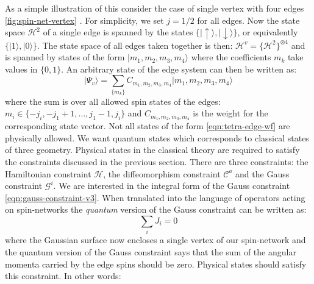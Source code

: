 \documentclass[preprint]{SciPost}
\newcommand{\mc}[1]{\mathcal{#1}}
\newcommand{\ket}[1]{\vert #1 \rangle}
\theoremstyle{plain} %
\begin{document}

As a simple illustration of this consider the case of single vertex with four edges \autoref{fig:spin-net-vertex} . For simplicity, we set $ j = 1/2 $ for all edges. Now the state space $ \mc{H}^2 $ of a single edge is spanned by the states $ \{\ket{\uparrow}, \ket{\downarrow} \} $, or equivalently $ \{ \ket{1}, \ket{0} \} $. The state space of all edges taken together is then: $ \mc{H}^v = \{\mc{H}^2\}^{\otimes 4} $ and is spanned by states of the form $ \ket{m_1, m_2, m_3, m_4} $ where the coefficients $ m_k $ take values in $\{0,1 \}$. An arbitrary state of the edge system can then be written as:
\begin{equation}\label{eqn:tetra-edge-wf}
\ket{\Psi_v} = \sum_{\{m_k\}} C_{m_1, m_2, m_3, m_4} \ket{m_1, m_2, m_3, m_4}
\end{equation}
where the sum is over all allowed spin states of the edges: $ m_i \in \{-j_i, -j_1 + 1, \ldots, j_1 - 1, j_i \} $ and $ C_{m_1, m_2, m_3, m_4} $ is the weight for the corresponding state vector. Not all states of the form \eqref{eqn:tetra-edge-wf} are physically allowed. We want quantum states which corresponds to classical states of three geometry. Physical states in the classical theory are required to satisfy the constraints discussed in the previous section. There are three constraints: the Hamiltonian constraint $ \mc{H} $, the diffeomorphism constraint $ \mc{C}^a $ and the Gauss constraint $ \mc{G}^i $. We are interested in the integral form of the Gauss constraint \eqref{eqn:gauss-constraint-v3}. When translated into the language of operators acting on spin-networks the \emph{quantum} version of the Gauss constraint can be written as:
\begin{equation}\label{eqn:quantum-gauss-constraint}
	\sum_i J_i = 0	
\end{equation}
where the Gaussian surface now encloses a single vertex of our spin-network and the quantum version of the Gauss constraint says that the sum of the angular momenta carried by the edge spins should be zero. Physical states should satisfy this constraint. In other words:
\end{document}

